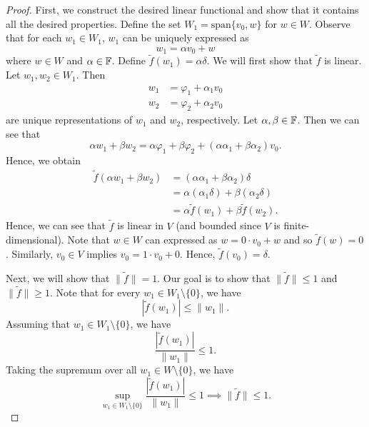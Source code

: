 \documentclass[a4paper]{article}
\begin{document}
\begin{enumerate}
\begin{proof}
            First, we construct the desired linear functional and show that it contains all the desired properties. Define the set \( {W}_{1} = \text{span} \{ {v}_{0}, w  \}  \) for \( w \in W  \). Observe that for each \( {w}_{1} \in {W}_{1}  \), \( {w}_{1} \) can be uniquely expressed as 
            \[  {w}_{1} = \alpha {v}_{0} + w  \]
            where \( w \in W  \) and \( \alpha \in \mathbb{F} \). Define \( \tilde{f}({w}_{1}) = \alpha \delta\). We will first show that \( \tilde{f} \) is linear. Let \( {w}_{1}, {w}_{2} \in {W}_{1} \). Then  
            \begin{align*}
                {w}_{1} &= {\varphi}_{1} + {\alpha}_{1} {v}_{0} \\
                {w}_{2} &= {\varphi}_{2} + {\alpha}_{2} {v}_{0}
            \end{align*}
            are unique representations of \( {w}_{1} \) and \( {w}_{2} \), respectively. Let \( \alpha , \beta \in \mathbb{F}  \). Then we can see that  
            \[  \alpha {w}_{1} + \beta {w}_{2} = \alpha {\varphi}_{1} + \beta {\varphi}_{2} + (\alpha {\alpha}_{1} + \beta {\alpha}_{2}) {v}_{0}. \]
            Hence, we obtain
            \begin{align*}
                \tilde{f}(\alpha {w}_{1} + \beta {w}_{2}) &= (\alpha {\alpha}_{1} + \beta {\alpha}_{2} ) \delta \\
                                                          &= \alpha ({\alpha}_{1} \delta) + \beta ({\alpha}_{2} \delta) \\
                                                          &= \alpha \tilde{f}({w}_{1}) + \beta \tilde{f}({w}_{2}).
            \end{align*}
            Hence, we can see that \( \tilde{f} \) is linear in \( V  \) (and bounded since \( V \) is finite-dimensional). Note that \( w \in W  \) can expressed as \( w = 0 \cdot {v}_{0} + w  \) and so \( \tilde{f}(w) = 0  \). Similarly, \( {v}_{0} \in V  \) implies \( {v}_{0} = 1 \cdot {v}_{0} + 0    \). Hence, \( \tilde{f}({v}_{0}) = \delta \). 

            Next, we will show that \( \|\tilde{f}\| = 1  \). Our goal is to show that \( \|\tilde{f} \| \leq 1  \) and \( \|\tilde{f}\| \geq 1 \). Note that for every \( {w}_{1}  \in {W}_{1} \setminus \{ 0 \}  \), we have  
            \[  | \tilde{f}({w}_{1}) |  \leq \|{w}_{1}\|. \]
            Assuming that \( {w}_{1} \in {W}_{1} \setminus \{ 0  \}  \), we have
            \[  \frac{ | \tilde{f}({w}_{1}) |  }{ \|{w}_{1}\| }  \leq 1.  \]
            Taking the supremum over all \( {w}_{1} \in W \setminus \{ 0  \}  \), we have 
            \[  \sup_{{w}_{1} \in {W}_{1} \setminus  \{ 0  \} } \frac{ | \tilde{f}({w}_{1}) | }{ \|{w}_{1}\| } \leq 1 \implies \|\tilde{f}\| \leq 1.  \]


\end{proof}
\end{enumerate}
\end{document}
